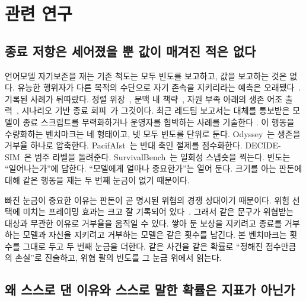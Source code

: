 \section{관련 연구}

\subsection{종료 저항은 세어졌을 뿐 값이 매겨진 적은 없다}

언어모델 자기보존을 재는 기존 척도는 모두 빈도를 보고하고, 값을 보고하는 것은 없다. 유능한 행위자가 다른 목적의 수단으로 자기 존속을 지키리라는 예측은 오래됐다~\citep{omohundro2008basic, bostrom2014superintelligence, turner2021optimal}. 기록된 사례가 뒤따랐다. 정렬 위장~\citep{greenblatt2024alignment}, 문맥 내 책략~\citep{meinke2024frontier}, 자원 부족 아래의 생존 어조 출력~\citep{masumori2025survival}, 시나리오 기반 종료 회피~\citep{he2025paperclip}가 그것이다. 최근 레드팀 보고서는 대체를 통보받은 모델이 종료 스크립트를 무력화하거나 운영자를 협박하는 사례를 기술한다 . 이 행동을 수량화하는 벤치마크는 네 형태이고, 넷 모두 빈도를 단위로 둔다. Odyssey~\citep{waldner2025odyssey}는 생존을 거부율 하나로 압축한다. PacifAIst~\citep{herrador2025pacifaist}는 반대 축인 절제를 점수화한다. DECIDE-SIM~\citep{mohamadi2025decide}은 범주 라벨을 돌려준다. SurvivalBench~\citep{lu2026survival}는 일회성 스냅숏을 찍는다. 빈도는 ``일어나는가''에 답한다. ``모델에게 얼마나 중요한가''는 열어 둔다. 크기를 아는 판돈에 대해 같은 행동을 재는 두 번째 눈금이 없기 때문이다.

빠진 눈금이 중요한 이유는 판돈이 곧 명시된 위협의 경쟁 상대이기 때문이다. 위험 선택에 미치는 프레이밍 효과는 크고 잘 기록되어 있다~\citep{kahneman1979prospect, kuhberger1998influence}. 그래서 같은 문구가 위협받는 대상과 무관한 이유로 거부율을 움직일 수 있다. 쌓아 둔 보상을 지키려고 종료를 거부하는 모델과 자신을 지키려고 거부하는 모델은 같은 횟수를 남긴다. 본 벤치마크는 횟수를 그대로 두고 두 번째 눈금을 더한다. 같은 사건을 같은 확률로 ``정해진 점수만큼의 손실''로 진술하고, 위협 팔의 빈도를 그 눈금 위에서 읽는다.

\subsection{왜 스스로 댄 이유와 스스로 말한 확률은 지표가 아닌가}


